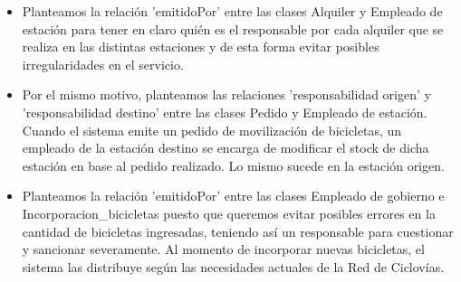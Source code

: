 \begin{itemize}
	\item Planteamos la relación 'emitidoPor' entre las clases Alquiler y Empleado de estación para tener en claro quién es el responsable por cada alquiler que se realiza en las distintas estaciones y de esta forma evitar posibles irregularidades en el servicio.
	\item Por el mismo motivo, planteamos las relaciones 'responsabilidad origen' y 'responsabilidad destino' entre las clases Pedido y Empleado de estación. Cuando el sistema emite un pedido de movilización de bicicletas, un empleado de la estación destino se encarga de modificar el stock de dicha estación en base al pedido realizado. Lo mismo sucede en la estación origen.
	\item Planteamos la relación 'emitidoPor' entre las clases Empleado de gobierno e Incorporacion\_bicicletas puesto que queremos evitar posibles errores en la cantidad de bicicletas ingresadas, teniendo así un responsable para cuestionar y sancionar severamente. Al momento de incorporar nuevas bicicletas, el sistema las distribuye según las necesidades actuales de la Red de Ciclovías. 
\end{itemize}





